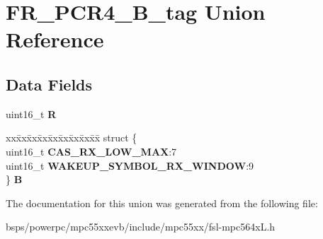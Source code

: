 \hypertarget{unionFR__PCR4__16B__tag}{}\section{F\+R\+\_\+\+P\+C\+R4\+\_\+B\+\_\+tag Union Reference}
\label{unionFR__PCR4__16B__tag}
\subsection*{Data Fields}
\begin{DoxyCompactItemize}
\item 
\mbox{\label{unionFR__PCR4__16B__tag_a5a9abb1f21be2078548dd6e34e702739}} 
uint16\+\_\+t {\bfseries R}
\item 
\mbox{\label{unionFR__PCR4__16B__tag_ad32727d273ca1d87bdb46b4cecfdffe0}} 
\begin{tabbing}
xx\=xx\=xx\=xx\=xx\=xx\=xx\=xx\=xx\=\kill
struct \{\\
\>uint16\_t {\bfseries CAS\_RX\_LOW\_MAX}:7\\
\>uint16\_t {\bfseries WAKEUP\_SYMBOL\_RX\_WINDOW}:9\\
\} {\bfseries B}\\

\end{tabbing}\end{DoxyCompactItemize}


The documentation for this union was generated from the following file\+:\begin{DoxyCompactItemize}
\item 
bsps/powerpc/mpc55xxevb/include/mpc55xx/fsl-\/mpc564x\+L.\+h\end{DoxyCompactItemize}

